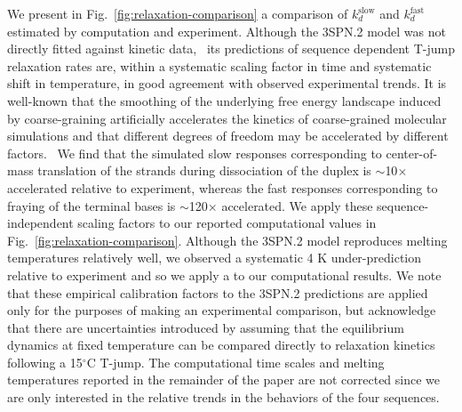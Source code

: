 \documentclass[journal=jpcbfk,manuscript=article]{achemso}
\newcommand*{\rood}[1]{{\color{red}{#1}}}
\begin{document}
We present in Fig.~\ref{fig:relaxation-comparison} a comparison of $k_d^\mathrm{slow}$ and $k_d^\mathrm{fast}$ estimated by computation and experiment. Although the 3SPN.2 model was not directly fitted against kinetic data,~\cite{Hinckley2013AnHybridization} its predictions of sequence dependent T-jump relaxation rates are, within a systematic scaling factor in time and systematic shift in temperature, in good agreement with observed experimental trends. It is well-known that the smoothing of the underlying free energy landscape induced by coarse-graining artificially accelerates the kinetics of coarse-grained molecular simulations and that different degrees of freedom may be accelerated by different factors.~\citep{Marrink2007TheSimulations, Fritz2011MultiscaleDynamics, Marrink2013PerspectiveModel} We find that the simulated slow responses corresponding to center-of-mass translation of the strands during dissociation of the duplex is $\sim$10$\times$ accelerated relative to experiment, whereas the fast responses corresponding to fraying of the terminal bases is $\sim$120$\times$ accelerated. We apply these sequence-independent scaling factors to our reported computational values in Fig.~\ref{fig:relaxation-comparison}. Although the 3SPN.2 model reproduces melting temperatures relatively well, we observed a systematic 4 K under-prediction relative to experiment and so we apply a \rood{universal (+4) K corrective temperature shift} to our computational results. We note that these empirical calibration factors to the 3SPN.2 predictions are applied only for the purposes of making an experimental comparison, but acknowledge that there are uncertainties introduced by assuming that the equilibrium dynamics at fixed temperature can be compared directly to relaxation kinetics following a 15$^\circ$C T-jump. The computational time scales and melting temperatures reported in the remainder of the paper are not corrected \rood{by these calibration corrections or finite-size fluctuation corrections} since we are only interested in the relative trends in the behaviors of the four sequences.
\end{document}
